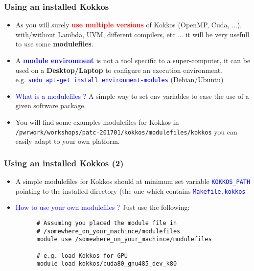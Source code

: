 \begin{frame}[fragile=singleslide]
  \frametitle{Using an installed Kokkos}

  \begin{itemize}
  \item As you will surely \textcolor{red}{\textbf{use multiple versions}} of Kokkos (OpenMP, Cuda, ...), with/without Lambda, UVM, different compilers, etc ... it will be very usefull to use some \textbf{modulefiles}.
  \item A \textcolor{blue}{\textbf{module environment}} is not a tool specific to a super-computer, it can be used on a \textbf{Desktop/Laptop} to configure an execution environment.\\
    e.g. \textcolor{blue}{\texttt{sudo apt-get install environment-modules}} (Debian/Ubuntu)
  \item \textcolor{blue}{What is a modulefiles ?}
    A simple way to set env variables to ease the use of a given software package.
  \item You will find some examples modulefiles for Kokkos in \texttt{/pwrwork/workshops/patc-201701/kokkos/modulefiles/kokkos} you can easily adapt to your own platform.
  \end{itemize}

\end{frame}

\begin{frame}[fragile=singleslide]
  \frametitle{Using an installed Kokkos (2)}

  \begin{itemize}
  \item A simple modulefiles for Kokkos should at minimum set variable \textcolor{blue}{\texttt{KOKKOS\_PATH}} pointing to the installed directory (the one which contains \textcolor{blue}{\texttt{Makefile.kokkos}}
  \item \textcolor{blue}{How to use your own modulefiles ?} Just use the following:
    \begin{verbatim}
      # Assuming you placed the module file in
      # /somewhere_on_your_machince/modulefiles
      module use /somewhere_on_your_machince/modulefiles
      
      # e.g. load Kokkos for GPU
      module load kokkos/cuda80_gnu485_dev_k80
    \end{verbatim}
  \end{itemize}

\end{frame}
